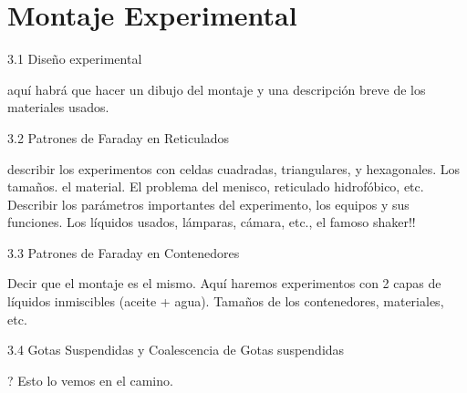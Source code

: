 \chapter{Montaje Experimental}

3.1 Diseño experimental

      aquí habrá que hacer un dibujo del montaje y una descripción breve de los 
      materiales usados.

3.2 Patrones de Faraday en Reticulados

      describir los experimentos con celdas cuadradas, triangulares, y hexagonales.
      Los tamaños. el material. El problema del menisco, reticulado hidrofóbico, etc.
      Describir los parámetros importantes del experimento, los equipos y sus
      funciones. Los líquidos usados, lámparas, cámara, etc., el famoso shaker!!

3.3 Patrones de Faraday en Contenedores

      Decir que el montaje es el mismo. Aquí haremos experimentos con 2 capas de
      líquidos inmiscibles (aceite + agua). Tamaños de los contenedores, materiales,
      etc.

3.4 Gotas Suspendidas y Coalescencia de Gotas suspendidas

      ?  Esto lo vemos en el camino.

